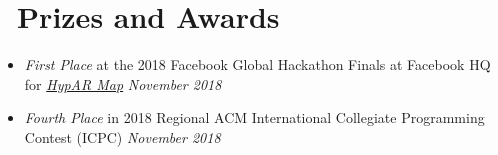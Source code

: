 \documentclass[10pt,letterpaper]{article}
\begin{document}
\section*{\faTrophy\ Prizes and Awards}
\begin{itemize}
    \item \textit{First Place} at the 2018 Facebook Global Hackathon Finals at
        Facebook HQ for
        \href{https://sumnerevans.com/pages/portfolio.html#HypAR-Map}{\textit{HypAR Map}}
        \hfill \textit{November 2018}
    \item \textit{Fourth Place} in 2018 Regional ACM International Collegiate
        Programming Contest (ICPC) \hfill \textit{November 2018}
\end{itemize}

\end{document}
